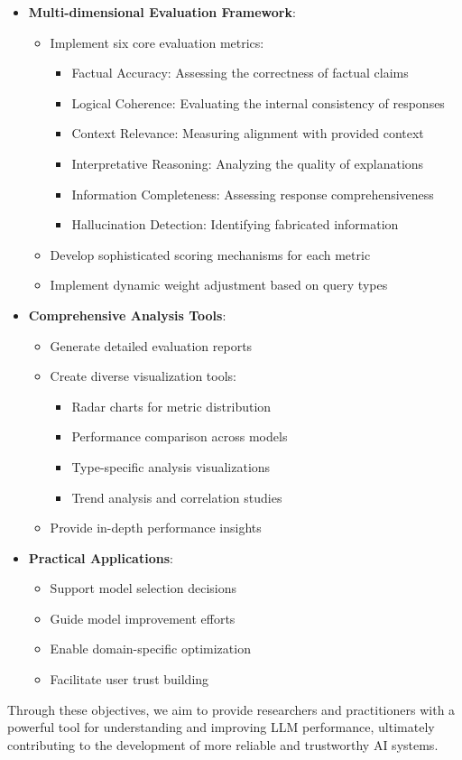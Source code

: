 \begin{itemize}
    \item \textbf{Multi-dimensional Evaluation Framework}:
    \begin{itemize}
        \item Implement six core evaluation metrics:
        \begin{itemize}
            \item Factual Accuracy: Assessing the correctness of factual claims
            \item Logical Coherence: Evaluating the internal consistency of responses
            \item Context Relevance: Measuring alignment with provided context
            \item Interpretative Reasoning: Analyzing the quality of explanations
            \item Information Completeness: Assessing response comprehensiveness
            \item Hallucination Detection: Identifying fabricated information
        \end{itemize}
        \item Develop sophisticated scoring mechanisms for each metric
        \item Implement dynamic weight adjustment based on query types
    \end{itemize}

    \item \textbf{Comprehensive Analysis Tools}:
    \begin{itemize}
        \item Generate detailed evaluation reports
        \item Create diverse visualization tools:
        \begin{itemize}
            \item Radar charts for metric distribution
            \item Performance comparison across models
            \item Type-specific analysis visualizations
            \item Trend analysis and correlation studies
        \end{itemize}
        \item Provide in-depth performance insights
    \end{itemize}

    \item \textbf{Practical Applications}:
    \begin{itemize}
        \item Support model selection decisions
        \item Guide model improvement efforts
        \item Enable domain-specific optimization
        \item Facilitate user trust building
    \end{itemize}
\end{itemize}

Through these objectives, we aim to provide researchers and practitioners with a powerful tool for understanding and improving LLM performance, ultimately contributing to the development of more reliable and trustworthy AI systems.

